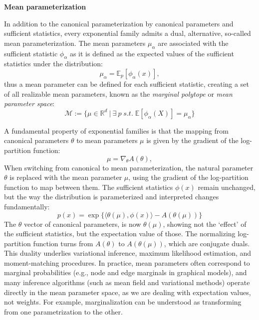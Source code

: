 \documentclass[encoding=utf8,british]{tumphthesis}
\begin{document}
            \textbf{Mean parameterization}

            In addition to the canonical parameterization by canonical parameters and sufficient statistics, every exponential family admits 
            a dual, alternative, so-called mean parameterization. The mean parameters $\mu_{\alpha}$ are
            associated with the sufficient statistic $\phi_{\alpha}$ as it is defined as the expected values of the sufficient statistics under the distribution:
            \begin{equation}
                \mu_{\alpha} = \mathbb{E}_{p}[\phi_{\alpha}(x)],
                \label{eq:expfam_def_mean}
            \end{equation}
            thus a mean parameter can be defined for each sufficient statistic, creating a set of all realizable mean parameters, known as the 
            \textit{marginal polytope} or \textit{mean parameter space}:
            \begin{equation}
                \mathcal{M} := \{ \mu \in \mathbb{R}^d \: | \: \exists \: p \; s.t. \; \mathbb{E}[\phi_{\alpha}(X)] = \mu_\alpha\}
            \end{equation}

            A fundamental property of exponential families is that the mapping from canonical parameters $\theta$ to mean parameters $\mu$ 
            is given by the gradient of the log-partition function:
            \begin{equation}
                \mu = \nabla_\theta A(\theta),
            \end{equation}
            When switching from canonical to mean parameterization, the natural parameter $\theta$ is replaced with the mean parameter 
            $\mu$, using the gradient of the log-partition function to map between them. The sufficient statistics $\phi(x)$ remain unchanged, 
            but the way the distribution is parameterized and interpreted changes fundamentally:
            \begin{equation}
                p(x) = \exp \{ \langle \theta(\mu) , \phi(x) \rangle - A(\theta(\mu)) \}
                \label{eq:expfam_def_mean}
            \end{equation}
            The $\theta$ vector of canonical parameters, is now $\theta(\mu)$, showing not the `effect' of the sufficient statistics, but the 
            expectation value of those. The normalizing log-partition function turns from $A(\theta)$ to $A(\theta(\mu))$, which are conjugate duals.
            This duality underlies variational inference, maximum likelihood estimation, and moment-matching procedures.
            In practice, mean parameters often correspond to marginal 
            probabilities (e.g., node and edge marginals in graphical models), and many inference algorithms (such as mean field and 
            variational methods) operate directly in the mean parameter space, as we are dealing with expectation values, not weights. 
            For example, marginalization can be understood as transforming from one parametrization to the other.
            
\end{document}
